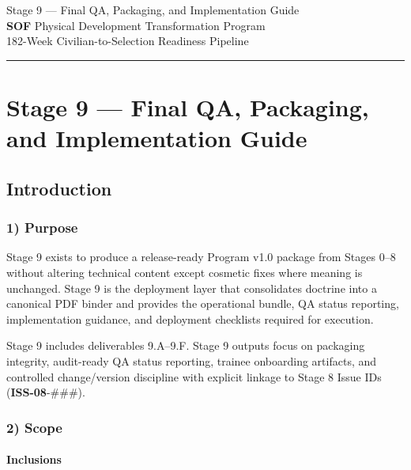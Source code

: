 \documentclass[10pt]{article}
\newcommand{\TitleLine}{\textcolor{StageBlue}{\rule{0.98\linewidth}{0.95pt}}}
\begin{document}
\begin{tcolorbox}
\begin{center}
Stage 9 — Final QA, Packaging, and Implementation Guide\\[0.35em]
\textbf{SOF} Physical Development Transformation Program\\[0.25em]
182-Week Civilian-to-Selection Readiness Pipeline\\[0.65em]
\TitleLine
\end{center}
\end{tcolorbox}

\vspace{0.35em}

\section*{Stage 9 — Final QA, Packaging, and Implementation Guide}
{}

\subsection*{Introduction}
{}

\subsubsection*{1) Purpose}

Stage 9 exists to produce a release-ready Program v1.0 package from Stages 0–8 without altering technical content except cosmetic fixes where meaning is unchanged. Stage 9 is the deployment layer that consolidates doctrine into a canonical PDF binder and provides the operational bundle, QA status reporting, implementation guidance, and deployment checklists required for execution.

Stage 9 includes deliverables 9.A–9.F. Stage 9 outputs focus on packaging integrity, audit-ready QA status reporting, trainee onboarding artifacts, and controlled change/version discipline with explicit linkage to Stage 8 Issue IDs (\textbf{ISS-08}-\#\#\#).

\subsubsection*{2) Scope}

\paragraph*{Inclusions}
\end{document}
